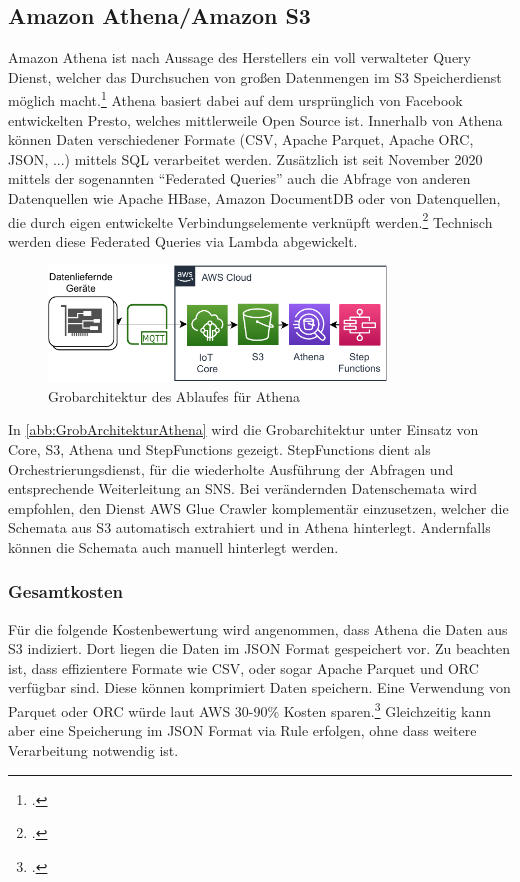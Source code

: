 \subsection{Amazon Athena/Amazon S3}\label{chap:athena}
Amazon Athena ist nach Aussage des Herstellers ein voll verwalteter Query Dienst, welcher das Durchsuchen von großen Datenmengen im \ac{S3} Speicherdienst möglich macht.\footcite[Vgl.][]{Barr.2016} Athena basiert dabei auf dem ursprünglich von Facebook entwickelten Presto, welches mittlerweile Open Source ist. Innerhalb von Athena können Daten verschiedener Formate (\ac{CSV}, Apache Parquet, Apache ORC, \ac{JSON}, ...) mittels \ac{SQL} verarbeitet werden. Zusätzlich ist seit November 2020 mittels der sogenannten \enquote{Federated Queries} auch die Abfrage von anderen Datenquellen wie Apache HBase, Amazon DocumentDB oder von Datenquellen, die durch eigen entwickelte Verbindungselemente verknüpft werden.\footcite[Vgl.][]{AmazonWebServicesInc..o.J.s} Technisch werden diese Federated Queries via Lambda abgewickelt.

\begin{figure}[H]
\centering
\includegraphics[width=0.8\textwidth]{graphics/Athena-general.pdf}
\caption{Grobarchitektur des Ablaufes für Athena}
\label{abb:GrobArchitekturAthena}
\end{figure}

In \autoref{abb:GrobArchitekturAthena} wird die Grobarchitektur unter Einsatz von \AWSIOT{} Core, \ac{S3}, Athena und StepFunctions gezeigt. StepFunctions dient als Orchestrierungsdienst, für die wiederholte Ausführung der Abfragen und entsprechende Weiterleitung an \ac{SNS}.
Bei verändernden Datenschemata wird empfohlen, den Dienst \ac{AWS} Glue Crawler komplementär einzusetzen, welcher die Schemata aus \ac{S3} automatisch extrahiert und in Athena hinterlegt. Andernfalls können die Schemata auch manuell hinterlegt werden.


\subsubsection{Gesamtkosten}
Für die folgende Kostenbewertung wird angenommen, dass Athena die Daten aus \ac{S3} indiziert. Dort liegen die Daten im \ac{JSON} Format gespeichert vor. Zu beachten ist, dass effizientere Formate wie CSV, oder sogar Apache Parquet und ORC verfügbar sind. Diese können komprimiert Daten speichern. Eine Verwendung von Parquet oder ORC würde laut \ac{AWS} 30-90\% Kosten sparen.\footcite[Vgl.][]{AmazonWebServicesInc..o.J.t} Gleichzeitig kann aber eine Speicherung im \ac{JSON} Format via \AWSIOT{} Rule erfolgen, ohne dass weitere Verarbeitung notwendig ist.

